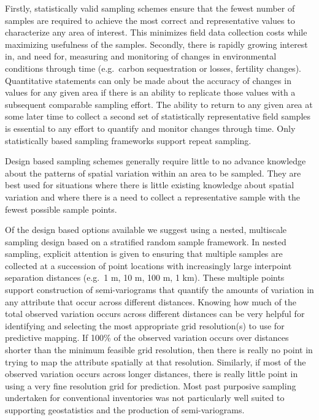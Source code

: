 \documentclass[graybox,natbib,nospthms,UStrade]{svmono}
\begin{document}
Firstly, statistically valid sampling schemes ensure that the fewest
number of samples are required to achieve the most correct and
representative values to characterize any area of interest. This
minimizes field data collection costs while maximizing usefulness of the
samples. Secondly, there is rapidly growing interest in, and need for,
measuring and monitoring of changes in environmental conditions through
time (e.g.~carbon sequestration or losses, fertility changes).
Quantitative statements can only be made about the accuracy of changes
in values for any given area if there is an ability to replicate those
values with a subsequent comparable sampling effort. The ability to
return to any given area at some later time to collect a second set of
statistically representative field samples is essential to any effort to
quantify and monitor changes through time. Only statistically based
sampling frameworks support repeat sampling.

Design based sampling schemes generally require little to no advance
knowledge about the patterns of spatial variation within an area to be
sampled. They are best used for situations where there is little
existing knowledge about spatial variation and where there is a need to
collect a representative sample with the fewest possible sample points.

Of the design based options available we suggest using a nested,
multiscale sampling design based on a stratified random sample
framework. In nested sampling, explicit attention is given to ensuring
that multiple samples are collected at a succession of point locations
with increasingly large interpoint separation distances (e.g.~1 m, 10 m,
100 m, 1 km). These multiple points support construction of
semi-variograms that quantify the amounts of variation in any attribute
that occur across different distances. Knowing how much of the total
observed variation occurs across different distances can be very helpful
for identifying and selecting the most appropriate grid resolution(s) to
use for predictive mapping. If 100\% of the observed variation occurs
over distances shorter than the minimum feasible grid resolution, then
there is really no point in trying to map the attribute spatially at
that resolution. Similarly, if most of the observed variation occurs
across longer distances, there is really little point in using a very
fine resolution grid for prediction. Most past purposive sampling
undertaken for conventional inventories was not particularly well suited
to supporting geostatistics and the production of semi-variograms.
\end{document}

